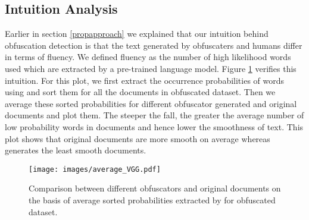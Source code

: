 \subsection{Intuition Analysis}
Earlier in section \ref{propapproach} we explained that our intuition behind obfuscation detection is that the text generated by obfuscaters and humans differ in terms of fluency.
%
We defined fluency as the number of high likelihood words used which are extracted by a pre-trained language model.
%
Figure \ref{intuit} verifies this intuition.
%
For this plot, we first extract the occurrence probabilities of words using \bertsmall and sort them for all the documents in \amt obfuscated dataset.
%
Then we average these sorted probabilities for different obfuscator generated and original documents and plot them.
%
The steeper the fall, the greater the average number of low probability words in documents and hence lower the smoothness of text.
%
This plot shows that original documents are more smooth on average whereas \dspan generates the least smooth documents.

\begin{figure}
  \centering
  \texttt{[image: images/average\_VGG.pdf]}
  \caption{Comparison between different obfuscators and original documents on the basis of average sorted probabilities extracted by \bertsmall for \amt obfuscated dataset.}\label{intuit}
\end{figure}